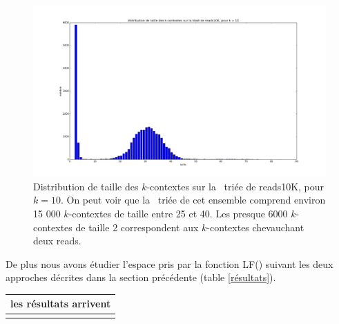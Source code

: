 \begin{figure}[!ht]
    \center
    \includegraphics[scale=0.3]{./images/distribReads10K_k10.png}
    \caption{Distribution de taille des $k$-contextes sur la \kbwt\ triée de reads10K, pour $k = 10$. On peut voir que la \kbwt\ triée de cet ensemble comprend environ 15 000 $k$-contextes de taille entre 25 et 40. Les presque 6000 $k$-contextes de taille 2 correspondent aux $k$-contextes chevauchant deux reads.}
    \label{tailleContextes}
\end{figure}

De plus nous avons étudier l'espace pris par la fonction LF() suivant les deux approches décrites dans la section précédente (table \ref{résultats}). 

\begin{tabular}{|c|}
	\hline
	les résultats arrivent\\
	\hline
\label{résultats}
\end{tabular}
